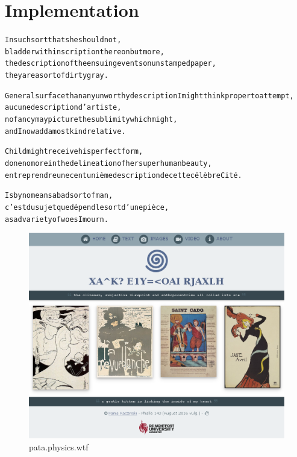 
\chapter{Implementation}
\label{ch:implementation}

\startcontents[chapters]

\vfill

\begin{alltt}\sffamily
In such sort that she should not,
bladder with inscription thereon but more,
the description of the ensuing events on unstamped paper,
they are a sort of dirty gray.

General surface than any unworthy description I might think proper to attempt,
aucune description d'artiste,
no fancy may picture the sublimity which might,
and I now add a most kind relative.

Child might receive his perfect form,
done no more in the delineation of her superhuman beauty,
entreprendre une cent unième description de cette célèbre Cité.

Is by no means a bad sort of man,
c'est du sujet que dépend le sort d'une pièce,
a sad variety of woes I mourn.
\end{alltt}

\newpage
\minicontents
\spirals

\begin{figure}[!htbp] %
  \centering
  \includegraphics[width=\linewidth]{images/fullscreenshot1}
\caption[pata.physics.wtf]{pata.physics.wtf}
\label{img:fullscreenshot1}
\end{figure}

